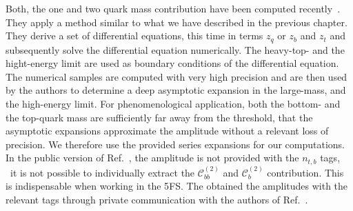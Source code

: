 Both, the one and two quark mass contribution have been computed recently~\cite{Czakon:2020vql,Niggetiedt:2023ywb}. They apply a method similar to what we have described in the previous chapter. They derive a set of differential equations, this time in terms $z_q$ or $z_b$ and $z_t$ and subsequently solve the differential equation numerically. The heavy-top- and the hight-energy limit are used as boundary conditions of the differential equation. The numerical samples are computed with very high precision and are then used by the authors to determine a deep asymptotic expansion in the large-mass, and the high-energy limit. For phenomenological application, both the bottom- and the top-quark mass are sufficiently far away from the threshold, that the asymptotic expansions approximate the amplitude without a relevant loss of precision. We therefore use the provided series expansions for our computations. In the public version of Ref.~\cite{Czakon:2020vql}, the amplitude is not provided with the $n_{t,b}$ tags, \ie\ it is not possible to individually extract the $\mathcal{C}_{bb}^{(2)}$ and $\mathcal{C}_{b}^{(2)}$ contribution. This is indispensable when working in the 5\acs{FS}. The obtained the amplitudes with the relevant tags through private communication with the authors of Ref.~\cite{Czakon:2020vql}.

